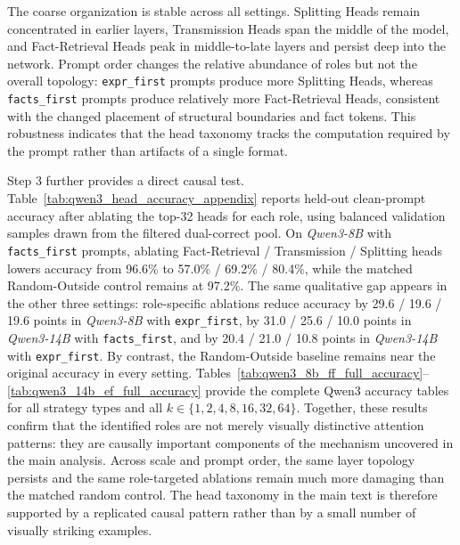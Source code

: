 \documentclass[11pt]{article}
\begin{document}
The coarse organization is stable across all settings. Splitting Heads remain concentrated in earlier layers, Transmission Heads span the middle of the model, and Fact-Retrieval Heads peak in middle-to-late layers and persist deep into the network. Prompt order changes the relative abundance of roles but not the overall topology: \texttt{expr\_first} prompts produce more Splitting Heads, whereas \texttt{facts\_first} prompts produce relatively more Fact-Retrieval Heads, consistent with the changed placement of structural boundaries and fact tokens. This robustness indicates that the head taxonomy tracks the computation required by the prompt rather than artifacts of a single format.

Step 3 further provides a direct causal test. Table~\ref{tab:qwen3_head_accuracy_appendix} reports held-out clean-prompt accuracy after ablating the top-32 heads for each role, using balanced validation samples drawn from the filtered dual-correct pool. On \textit{Qwen3-8B} with \texttt{facts\_first} prompts, ablating Fact-Retrieval / Transmission / Splitting heads lowers accuracy from 96.6\% to 57.0\% / 69.2\% / 80.4\%, while the matched Random-Outside control remains at 97.2\%. The same qualitative gap appears in the other three settings: role-specific ablations reduce accuracy by 29.6 / 19.6 / 19.6 points in \textit{Qwen3-8B} with \texttt{expr\_first}, by 31.0 / 25.6 / 10.0 points in \textit{Qwen3-14B} with \texttt{facts\_first}, and by 20.4 / 21.0 / 10.8 points in \textit{Qwen3-14B} with \texttt{expr\_first}. By contrast, the Random-Outside baseline remains near the original accuracy in every setting. Tables~\ref{tab:qwen3_8b_ff_full_accuracy}--\ref{tab:qwen3_14b_ef_full_accuracy} provide the complete Qwen3 accuracy tables for all strategy types and all $k \in \{1,2,4,8,16,32,64\}$. Together, these results confirm that the identified roles are not merely visually distinctive attention patterns: they are causally important components of the mechanism uncovered in the main analysis.
Across scale and prompt order, the same layer topology persists and the same role-targeted ablations remain much more damaging than the matched random control. The head taxonomy in the main text is therefore supported by a replicated causal pattern rather than by a small number of visually striking examples.
\end{document}

